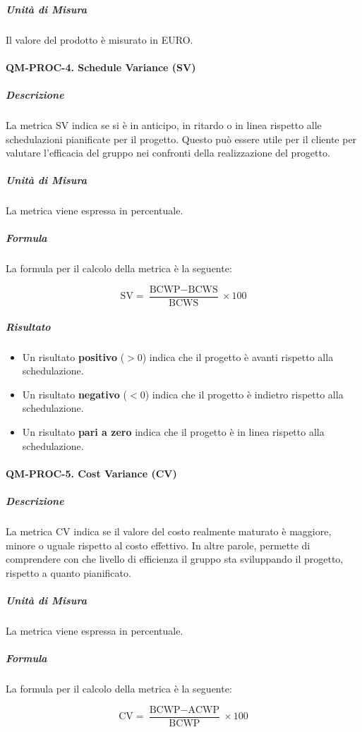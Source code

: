 			\subparagraph{Unità di Misura}
			Il valore del prodotto è misurato in EURO.

		\paragraph{QM-PROC-4. Schedule Variance (SV)}

			\subparagraph{Descrizione}
			La metrica SV indica se si è in anticipo, in ritardo o in linea rispetto alle schedulazioni pianificate per il progetto. Questo può essere utile per il cliente per valutare l'efficacia del gruppo nei confronti della realizzazione del progetto.

			\subparagraph{Unità di Misura}
			La metrica viene espressa in percentuale.

			\subparagraph{Formula}
			La formula per il calcolo della metrica è la seguente:

			\[
				\text{SV} = \frac{\text{BCWP} - \text{BCWS}}{\text{BCWS}} \times 100
			\]

			\subparagraph{Risultato}
			\begin{itemize}
				\item Un risultato \textbf{positivo} (\(> 0\)) indica che il progetto è avanti rispetto alla schedulazione.
				\item Un risultato \textbf{negativo} (\(< 0\)) indica che il progetto è indietro rispetto alla schedulazione.
				\item Un risultato \textbf{pari a zero} indica che il progetto è in linea rispetto alla schedulazione.
			\end{itemize}

		\paragraph{QM-PROC-5. Cost Variance (CV)}

			\subparagraph{Descrizione}
			La metrica CV indica se il valore del costo realmente maturato è maggiore, minore o uguale rispetto al costo effettivo. In altre parole, permette di comprendere con che livello di efficienza il gruppo sta sviluppando il progetto, rispetto a quanto pianificato.

			\subparagraph{Unità di Misura}
			La metrica viene espressa in percentuale.

			\subparagraph{Formula}
			La formula per il calcolo della metrica è la seguente:

			\[
				\text{CV} = \frac{\text{BCWP} - \text{ACWP}}{\text{BCWP}} \times 100
			\]

